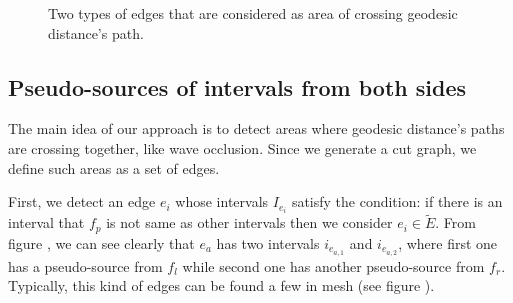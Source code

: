 \documentclass[a4paper,twoside]{article}
\begin{document}
\begin{figure}[h!]
	\centering		
	\hspace{0pt}

	\caption[]{Two types of edges that are considered as area of crossing geodesic distance's path.}
	\label{fig:fig-two-type-edges}
\end{figure}


\subsection{Pseudo-sources of intervals from both sides}
\label{subsec:pseudo-sources laid on both side of adjacent faces}
The main idea of our approach is to detect areas where geodesic distance's paths are crossing together, like wave occlusion. Since we generate a cut graph, we define such areas as a set of edges.

First, we detect an edge $e_i$ whose intervals $I_{e_i}$ satisfy the condition: if there is an interval that $f_p$ is not same as other intervals then we consider $e_i \in \tilde{E}$. From figure , we can see clearly that $e_a$ has two intervals $i_{e_{a,1}}$ and $i_{e_{a,2}}$, where first one has a pseudo-source from $f_l$ while second one has another pseudo-source from $f_r$. Typically, this kind of edges can be found a few in mesh (see figure ). 
\end{document}
